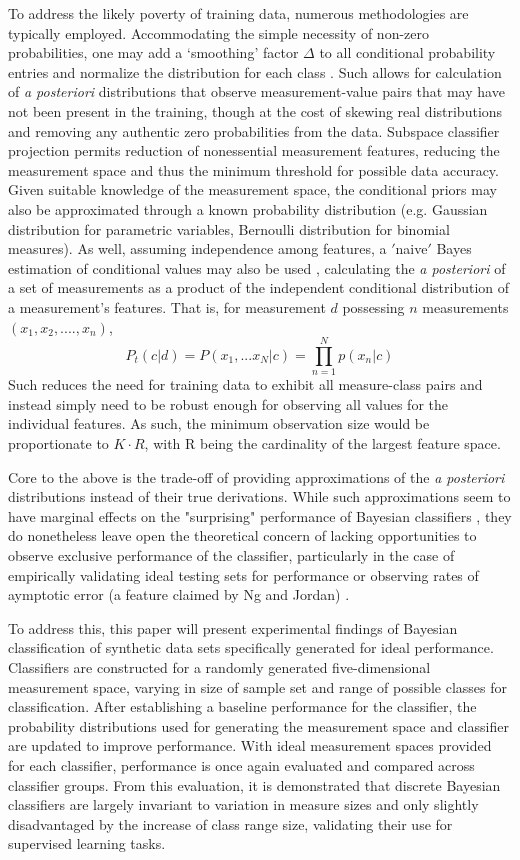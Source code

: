 \documentclass[10pt, conference]{IEEEtran}
\begin{document}
To address the likely poverty of training data, numerous methodologies are typically employed. Accommodating the simple necessity of non-zero probabilities,  one may add a ‘smoothing’ factor $\Delta$ to all conditional probability entries and normalize the distribution for each class \cite{b4}. Such allows for calculation of \textit{a posteriori} distributions that observe measurement-value pairs that may have not been present in the training, though at the cost of skewing real distributions and removing any authentic zero probabilities from the data. Subspace classifier projection permits reduction of nonessential measurement features, reducing the measurement space and thus the minimum threshold for possible data accuracy. Given suitable knowledge of the measurement space, the conditional priors may also be approximated through a known probability distribution (e.g. Gaussian distribution for parametric variables, Bernoulli distribution for binomial measures). As well, assuming independence among features, a $'$naive$'$ Bayes estimation of conditional values may also be used \cite{b1} \cite{b2}, calculating the \textit{a posteriori} of a set of measurements as a product of the independent conditional distribution of a measurement's features. That is, for measurement $d$ possessing $n$ measurements $(x_1,x_2,....,x_n)$,
\begin{equation}
P_t(c|d) = P(x_1,...x_N|c)=\prod_{n=1}^N p(x_n|c)
\end{equation}
 Such reduces the need for training data to exhibit all measure-class pairs and instead simply need to be robust enough for observing all values for the individual features. As such, the minimum observation size would be proportionate to $K \cdot R$, with R being the cardinality of the largest feature space. 

Core to the above is the trade-off of providing approximations of the \textit{a posteriori} distributions instead of their true derivations. While such approximations seem to have marginal effects on the "surprising" performance  of Bayesian classifiers \cite{b1}, they do nonetheless leave open the theoretical concern of lacking opportunities to observe exclusive performance of the classifier, particularly in the case of empirically validating ideal testing sets for performance or observing rates of aymptotic error (a feature claimed by Ng and Jordan) \cite{b3}. 

To address this, this paper will present experimental findings of Bayesian classification of synthetic data sets specifically generated for ideal performance. Classifiers are constructed for a randomly generated five-dimensional measurement space, varying in size of sample set and range of possible classes for classification. After establishing a baseline performance for the classifier, the probability distributions used for generating the measurement space and classifier are updated to improve performance. With ideal measurement spaces provided for each classifier, performance is once again evaluated and compared across classifier groups. From this evaluation, it is demonstrated that discrete Bayesian classifiers are largely invariant to variation in measure sizes and only slightly disadvantaged by the increase of class range size, validating their use for supervised learning tasks.
\end{document}
